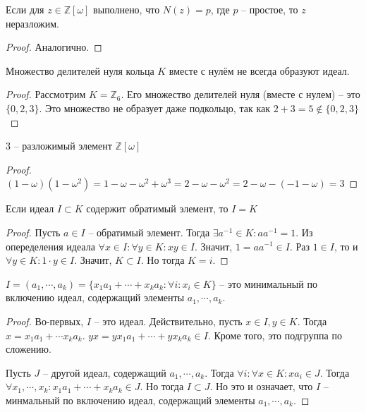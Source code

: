 \documentclass{article}
\begin{document}
\begin{statement}
    Если для $z \in \mathbb{Z}[\omega]$ выполнено, что $N(z) = p$, где $p$ -- простое, то $z$ неразложим.
\end{statement}

\begin{proof}
    Аналогично.
\end{proof}

\begin{statement}
    Множество делителей нуля кольца $K$ вместе с нулём не всегда образуют идеал.
\end{statement}

\begin{proof}
    Рассмотрим $K = \mathbb{Z}_6$. Его множество делителей нуля (вместе с нулем) -- это $\{0, 2, 3\}$. Это множество не
    образует даже подкольцо, так как $2 + 3 = 5 \not \in \{0, 2, 3\}$
\end{proof}

\begin{statement}
    3 -- разложимый элемент $\mathbb{Z}[\omega]$
\end{statement}

\begin{proof}
    $(1 - \omega)(1 - \omega^2) = 1 - \omega - \omega^2 + \omega^3 = 2 - \omega - \omega^2 = 2 - \omega - (-1 -
    \omega) = 3$
\end{proof}

\begin{statement}
    Если идеал $I \subset K$ содержит обратимый элемент, то $I = K$
\end{statement}

\begin{proof}
    Пусть $a \in I$ -- обратимый элемент. Тогда $\exists a^{-1} \in K: a a^{-1} = 1$. Из опеределения идеала $\forall x
    \in I: \forall y \in K: xy \in I$. Значит, $1 = a a^{-1} \in I$. Раз $1 \in I$, то и $\forall y \in K: 1 \cdot y \in
    I$. Значит, $K \subset I$. Но тогда $K = i$.
\end{proof}

\begin{statement}
    $I = (a_1, \cdots, a_k) = \{x_1 a_1 + \cdots + x_k a_k : \forall i : x_i \in K \}$ -- это минимальный по включению
    идеал, содержащий элементы $a_1, \cdots, a_k$.
\end{statement}

\begin{proof}
    Во-первых, $I$ -- это идеал. Действительно, пусть $x \in I, y \in K$. Тогда $x = x_1 a_1 + \cdots x_k a_k$. $yx = y
    x_1 a_1 + \cdots + y x_k a_k \in I$. Кроме того, это подгруппа по сложению.

    Пусть $J$ -- другой идеал, содержащий $a_1, \cdots, a_k$. Тогда $\forall i: \forall x \in K: x a_i \in J$. Тогда
    $\forall x_1, \cdots, x_k: x_1 a_1 + \cdots + x_k a_k \in J$. Но тогда $I \subset J$. Но это и означает, что $I$ --
    минмальный по включению идеал, содержащий элементы $a_1, \cdots, a_k$.
\end{proof}
\end{document}
